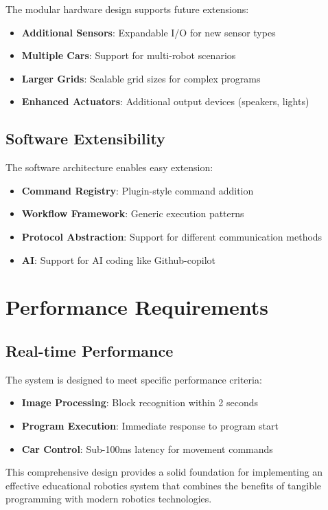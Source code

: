 The modular hardware design supports future extensions:

\begin{itemize}
    \item \textbf{Additional Sensors}: Expandable I/O for new sensor types
    \item \textbf{Multiple Cars}: Support for multi-robot scenarios
    \item \textbf{Larger Grids}: Scalable grid sizes for complex programs
    \item \textbf{Enhanced Actuators}: Additional output devices (speakers, lights)
\end{itemize}

\subsection{Software Extensibility}

The software architecture enables easy extension:

\begin{itemize}
    \item \textbf{Command Registry}: Plugin-style command addition
    \item \textbf{Workflow Framework}: Generic execution patterns
    \item \textbf{Protocol Abstraction}: Support for different communication methods
    \item \textbf{AI}: Support for AI coding like Github-copilot
\end{itemize}

\section{Performance Requirements}

\subsection{Real-time Performance}

The system is designed to meet specific performance criteria:

\begin{itemize}
    \item \textbf{Image Processing}: Block recognition within 2 seconds
    \item \textbf{Program Execution}: Immediate response to program start
    \item \textbf{Car Control}: Sub-100ms latency for movement commands
\end{itemize}



This comprehensive design provides a solid foundation for implementing an effective educational robotics system that combines the benefits of tangible programming with modern robotics technologies.